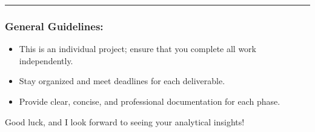 \documentclass[
]{article}
\providecommand{\tightlist}{%
  \setlength{\itemsep}{0pt}\setlength{\parskip}{0pt}}
\begin{document}
\begin{center}\rule{0.5\linewidth}{0.5pt}\end{center}

\subsubsection{\texorpdfstring{\textbf{General
Guidelines}:}{General Guidelines:}}\label{general-guidelines}

\begin{itemize}
\tightlist
\item
  This is an individual project; ensure that you complete all work
  independently.
\item
  Stay organized and meet deadlines for each deliverable.
\item
  Provide clear, concise, and professional documentation for each phase.
\end{itemize}

Good luck, and I look forward to seeing your analytical insights!
\end{document}
